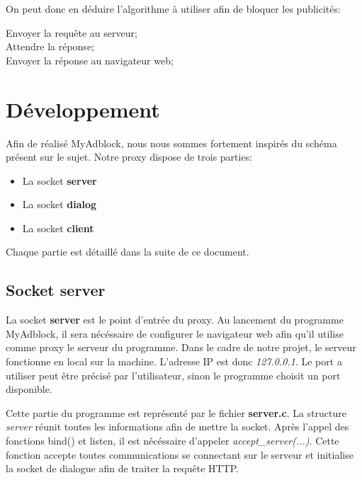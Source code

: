 \documentclass[a4paper,11pt, oneside]{book}
\def\appName{MyAdblock}
\begin{document}
		\clearpage
		On peut donc en déduire l'algorithme à utiliser afin de bloquer les publicités:\\

		\begin{algorithm}[H]
			{
				Envoyer la requête au serveur;\\
				Attendre la réponse;\\
				Envoyer la réponse au navigateur web;
			}
		\end{algorithm}


		\chapter{Développement}

			Afin de réalisé \appName, nous nous sommes fortement inspirés du schéma présent sur le sujet.
			Notre proxy dispose de trois parties:
			\begin{itemize}
				\item La socket \textbf{server}
				\item La socket \textbf{dialog}
				\item La socket \textbf{client}
			\end{itemize}

			Chaque partie est détaillé dans la suite de ce document.


		\section{Socket server}

			La socket \textbf{server} est le point d'entrée du proxy. Au lancement du programme \appName,
			il sera nécéssaire de configurer le navigateur web afin qu'il utilise comme proxy le serveur du programme.
			Dans le cadre de notre projet, le serveur fonctionne en local sur la machine. L'adresse IP est donc \textit{127.0.0.1}. Le port
			a utiliser peut être précisé par l'utilisateur, sinon le programme choisit un port disponible.

			Cette partie du programme est représenté par le fichier \textbf{server.c}. La structure \textit{server} réunit toutes les informations
			afin de mettre la socket. Après l'appel des fonctions bind() et listen, il est nécéssaire
			d'appeler \textit{accept\_server(...)}. Cette fonction accepte toutes communications se connectant sur le serveur
			et initialise la socket de dialogue afin de traiter la requête HTTP.
\end{document}
